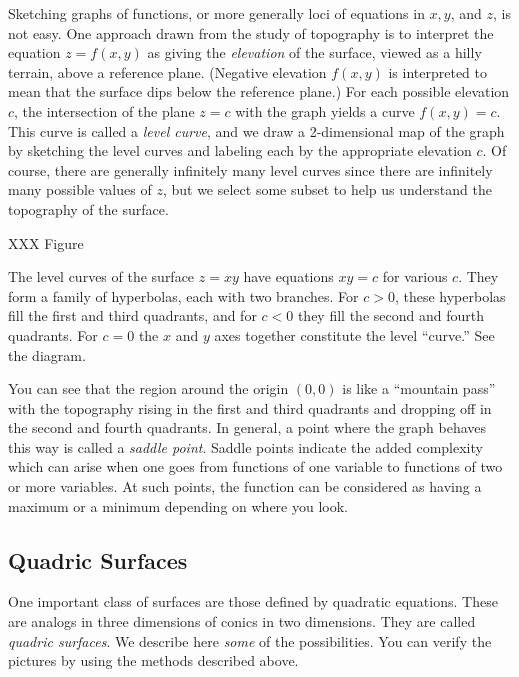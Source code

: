 Sketching graphs of functions, or more generally loci of equations
in $x, y$, and $z$, is not easy.   One approach drawn from the
study of topography is to interpret the equation $z = f(x,y)$ as
giving the \emph{elevation} of the surface, viewed as a hilly
terrain, above a reference plane.  (Negative elevation
 $f(x,y)$ is
interpreted to mean that the surface dips below the reference plane.)
For each possible elevation $c$,
 the intersection of the plane $z = c$ with the graph
yields a curve $f(x,y) = c$.  This curve is called a \emph{level curve}, 
and we draw a 2-dimensional map of the graph by sketching
the level curves and labeling each by the appropriate elevation
$c$.  Of course, there are generally infinitely many level curves
since there are infinitely many possible values of $z$, but we
select some subset to help us understand the topography of the
surface.

XXX Figure

\begin{example}
	The level curves of the surface $z = xy$ have equations
	$xy = c$ for various $c$.  They form 
	a family of hyperbolas, each with two branches.  For $c > 0$,
	these hyperbolas fill the first and third quadrants, and for
	$c < 0$ they fill the second and fourth quadrants.  For $c  = 0$
	the $x$ and $y$ axes together constitute the level ``curve.''
	See the diagram.

	You can see that the region around the origin $(0,0)$ is like a
	``mountain pass'' with the topography rising in the first and
	third quadrants and dropping off in the second and fourth quadrants.
	In general, a point where the graph behaves this way is called
	a \emph{saddle point}.   Saddle points indicate the added complexity
	which can arise when one goes from functions of one variable to
	functions of two or more variables.  At such points, the function
	can be considered as having a maximum  or
	 a minimum depending on where you
	look.
\end{example}

\subsection{Quadric Surfaces}
One important class of surfaces are those defined by quad\-rat\-ic
equations.  These are analogs in three dimensions of
conics in two dimensions.  They are called \emph{quadric surfaces}.  
We describe here \emph{some} of the possibilities.
You can verify the pictures by using the methods described above.

